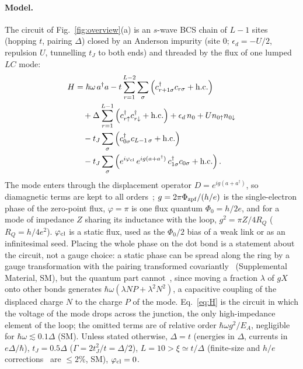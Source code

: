 \paragraph*{Model.}
The circuit of Fig.~\ref{fig:overview}(a) is an $s$-wave BCS chain of $L-1$ sites (hopping $t$, pairing
$\Delta$) closed by an Anderson impurity (site $0$; $\epsilon_d=-U/2$, repulsion $U$, tunnelling $t_J$
to both ends) and threaded by the flux of one lumped $LC$ mode:
\begin{align}
  H &= \hbar\omega\, a^\dagger a
     -t\sum_{r=1}^{L-2}\sum_\sigma\left(c^\dagger_{r+1\sigma}c_{r\sigma}+{\rm h.c.}\right)
     \nonumber\\
    &\quad +\Delta\sum_{r=1}^{L-1}\left(c^\dagger_{r\uparrow}c^\dagger_{r\downarrow}+{\rm h.c.}\right)
     +\epsilon_d\, n_0 + U n_{0\uparrow}n_{0\downarrow}
     \nonumber\\
    &\quad -t_J\sum_\sigma\left(c^\dagger_{0\sigma}c_{L-1\,\sigma}+{\rm h.c.}\right)
     \nonumber\\
    &\quad -t_J\sum_\sigma\left(e^{i\varphi_{\rm cl}}\,e^{ig(a+a^\dagger)}\,c^\dagger_{1\sigma}c_{0\sigma}+{\rm h.c.}\right).
  \label{eq:H}
\end{align}
The mode enters through the displacement operator $D=e^{ig(a+a^\dagger)}$, so diamagnetic terms are kept
to all orders~\cite{Li2020,Dmytruk2021}; $g=2\pi\Phi_{\rm zpf}/(h/e)$ is the single-electron phase of the
zero-point flux, $\varphi=\pi$ is one flux quantum $\Phi_0=h/2e$, and for a mode of impedance $Z$ sharing
its inductance with the loop, $g^2=\pi Z/4R_Q$ ($R_Q=h/4e^2$). $\varphi_{\rm cl}$ is a static flux, used
as the $\Phi_0/2$ bias of a weak link or as an infinitesimal seed. Placing the whole phase on the dot
bond is a statement about the circuit, not a gauge choice: a static phase can be spread along the ring by
a gauge transformation with the pairing transformed covariantly~\cite{Dmytruk2021} (Supplemental Material,
SM), but the quantum part cannot~\cite{DmytrukTrifSimon2016}, since moving a fraction $\lambda$ of $gX$ onto
other bonds generates $\hbar\omega(\lambda NP+\lambda^2N^2)$, a capacitive coupling of the displaced charge $N$
to the charge $P$ of the mode. Eq.~\eqref{eq:H} is the circuit in which the voltage of the mode drops across
the junction, the only high-impedance element of the loop; the omitted terms are of relative order
$\hbar\omega g^2/E_A$, negligible for $\hbar\omega\lesssim0.1\Delta$ (SM). Unless stated otherwise, $\Delta=t$ (energies in $\Delta$, currents in $e\Delta/\hbar$),
$t_J=0.5\Delta$ ($\Gamma=2t_J^2/t=\Delta/2$), $L=10>\xi\simeq t/\Delta$ (finite-size and $h/e$
corrections~\cite{LossGoldbart1991} are $\le2\%$, SM), $\varphi_{\rm cl}=0$.

